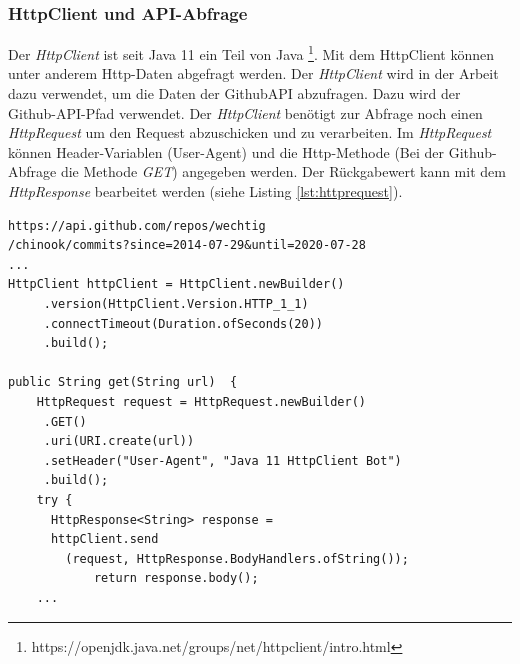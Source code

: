 \subsubsection{HttpClient und API-Abfrage}
Der \textit{HttpClient} ist seit Java 11 ein Teil von Java \footnote{https://openjdk.java.net/groups/net/httpclient/intro.html}. Mit dem HttpClient können unter anderem Http-Daten abgefragt werden. Der \textit{HttpClient} wird in der Arbeit dazu verwendet, um die Daten der GithubAPI abzufragen. Dazu wird der Github-API-Pfad verwendet. Der \textit{HttpClient} benötigt zur Abfrage noch einen \textit{HttpRequest} um den Request abzuschicken und zu verarbeiten. Im \textit{HttpRequest} können Header-Variablen (User-Agent) und die Http-Methode (Bei der Github-Abfrage die Methode \textit{GET}) angegeben werden. Der Rückgabewert kann mit dem \textit{HttpResponse} bearbeitet werden (siehe Listing   \ref{lst:httprequest}).
\lstset{
  caption=[Listing für die Implementierung für die Abfrage der Github-API und Beispiel-Request.]{Listing für die Implementierung für die Abfrage der Github-API. Am Beginn des Listings wird in einem Kommentar ein Beispiel-Link für den Request angezeigt. Im Link enthalten ist der Benutzername des Users und der Datumsbereich, aus dem die Commits geladen werden sollen.}, 
  basicstyle=\small\ttfamily, 
  label=lst:httprequest, 
  language=Java,
  frame=single,
  breaklines=true, %
  postbreak=\mbox{\textcolor{red}{$\hookrightarrow$}\space},
}
\begin{samepage}%
	\begin{lstlisting}[float=tbhp]
https://api.github.com/repos/wechtig
/chinook/commits?since=2014-07-29&until=2020-07-28
...
HttpClient httpClient = HttpClient.newBuilder()
     .version(HttpClient.Version.HTTP_1_1)
     .connectTimeout(Duration.ofSeconds(20))
     .build();

public String get(String url)  {
    HttpRequest request = HttpRequest.newBuilder()
     .GET()
     .uri(URI.create(url))
     .setHeader("User-Agent", "Java 11 HttpClient Bot")
     .build();
    try {
      HttpResponse<String> response = 
      httpClient.send
      	(request, HttpResponse.BodyHandlers.ofString());
            return response.body();
	...
	\end{lstlisting}
\end{samepage}
